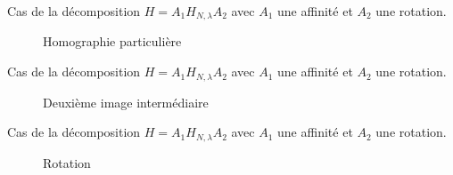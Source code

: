 \documentclass[c,12pt]{beamer}
\newcommand{\Arrow}{{ \raisebox{10\height}{\scalebox{1}{$\longrightarrow$}}}}
\begin{document}
  \begin{frame}
  Cas de la décomposition $H=A_1H_{N,\lambda}A_2$ avec $A_1$ une affinité et $A_2$ une rotation.
  \begin{figure}
   \Arrow
   \caption{Homographie particulière}
  \end{figure}
  \end{frame}
  
  \begin{frame}
  Cas de la décomposition $H=A_1H_{N,\lambda}A_2$ avec $A_1$ une affinité et $A_2$ une rotation.
  \begin{figure}
   \caption{Deuxième image intermédiaire}
  \end{figure}
  \end{frame}
  
  \begin{frame}
  Cas de la décomposition $H=A_1H_{N,\lambda}A_2$ avec $A_1$ une affinité et $A_2$ une rotation.
  \begin{figure}
   \Arrow
   \caption{Rotation}
  \end{figure}
  \end{frame}
  
\end{document}
